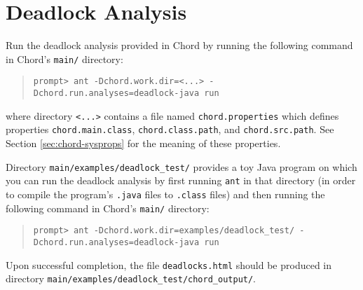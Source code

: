 \section{Deadlock Analysis}
\label{sec:deadlock}

Run the deadlock analysis provided in Chord by running the following command in Chord's \verb+main/+ directory:

\begin{quote}
\begin{verbatim}
prompt> ant -Dchord.work.dir=<...> -Dchord.run.analyses=deadlock-java run
\end{verbatim}
\end{quote}

where directory \verb+<...>+ contains a file named \verb+chord.properties+ which 
defines properties \verb+chord.main.class+, \verb+chord.class.path+, and \verb+chord.src.path+.
See Section \ref{sec:chord-sysprops} for the meaning of these properties.

Directory \verb+main/examples/deadlock_test/+ provides a toy Java program on which you can run the deadlock
analysis by first running \verb+ant+ in that directory (in order to compile the program's \verb+.java+ files to
\verb+.class+ files) and then running the following command in Chord's \verb+main/+ directory:

\begin{quote}
\begin{verbatim}
prompt> ant -Dchord.work.dir=examples/deadlock_test/ -Dchord.run.analyses=deadlock-java run
\end{verbatim}
\end{quote}

Upon successful completion, the file \verb+deadlocks.html+ should be produced in directory
\verb+main/examples/deadlock_test/chord_output/+.


